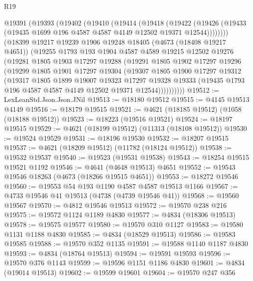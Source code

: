 \begin{lexlean}{R19}
\begin{coremodule}
    @19391
      (@19393
        (@19402
          (@19410
            (@19414
              (@19418
                (@19422
                  (@19426 (@19433 (@19435 @1699 @196 @4587 @4587 @4149 @12502 @19371 @12544))))))))
        (@18399
          @19217
          @19239
          @1906
          @19248
          @18405
          (@4673 (@18408 @19217 @4651))
          (@19255
            @1793
            @193
            @1904
            @4587
            @4589
            @19215
            @12502
            @19276
            (@19281
              @1805
              @1903
              @17297
              @19288
              (@19291
                @1805
                @1902
                @17297
                @19296
                (@19299
                  @1805
                  @1901
                  @17297
                  @19304
                  (@19307
                    @1805
                    @1900
                    @17297
                    @19312
                    (@19317
                      @1805
                      @1899
                      @19007
                      @19323
                      @17297
                      @19328
                      @19333
                      (@19435 @1793 @196 @4587 @4587 @4149 @12502 @19371 @12544))))))))))
@19512 := LexLeanStd.Json.Json.JNil
@19513 := @18180 @19512
@19515 := @4145 @19513 @4149
@19516 := @18179 @19515
@19521 := @4621 (@18185 @19512) (@1058 (@18188 @19512))
@19523 := @18223 (@19516 @19521)
@19524 := @18197 @19515
@19529 := @4621 (@18199 @19512) (@11313 (@18108 @19512))
@19530 := @19524 @19529
@19531 := @18196 @19530
@19532 := @18207 @19515
@19537 := @4621 (@18209 @19512) (@11782 (@18124 @19512))
@19538 := @19532 @19537
@19540 := @19523 (@19531 @19538)
@19543 := @18254 @19515 @19521 @1192
@19546 := @4641 (@4648 @19513) @4651
@19552 := @19543 @19546 @18263 (@4673 (@18266 @19515 @4651))
@19553 := @18272 @19546
@19560 := @19553 @54 @193 @1190 @4587 @4587 @19513 @1166
@19567 := @4733 @19546 @41 @19513 (@4738 (@4739 @19546 @41))
@19568 := @19560 @19567
@19570 := @4812 @19546 @19513
@19572 := @19570 @238 @216
@19575 := @19572 @1124 @1189 @4830
@19577 := @4834 (@18306 @19513)
@19578 := @19575 @19577
@19580 := @19570 @310 @1127
@19583 := @19580 @1131 @1188 @4830
@19585 := @4834 (@18529 @19513)
@19586 := @19583 @19585
@19588 := @19570 @352 @1135
@19591 := @19588 @1140 @1187 @4830
@19593 := @4834 (@18764 @19513)
@19594 := @19591 @19593
@19596 := @19570 @376 @1143
@19599 := @19596 @1151 @1186 @4830
@19601 := @4834 (@19014 @19513)
@19602 := @19599 @19601
@19604 := @19570 @247 @356

\end{coremodule}
\end{lexlean}
